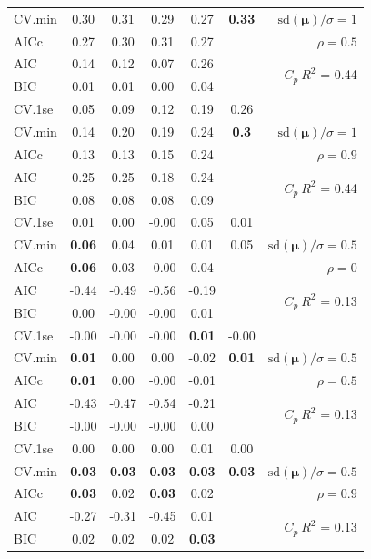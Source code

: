 \documentclass[12pt]{article}
\newcommand{\mr}[1]{\mathrm{#1}}
\newcommand{\bm}[1]{\mathbf{#1}}
\begin{document}
\begin{table}[p]
\begin{center}
\begin{tabular}{l*{5}{c}|r}
CV.min & 0.30 & 0.31 & 0.29 & 0.27 & {\bf 0.33} &  $\mr{sd}(\bm{\mu})/\sigma=1$ \\
AICc & 0.27 & 0.30 & 0.31 & 0.27 & & $\rho=0.5$ \\
AIC & 0.14 & 0.12 & 0.07 & 0.26 & & \multirow{2}{*}{$C_p ~ R^2$ = 0.44} \\
BIC & 0.01 & 0.01 & 0.00 & 0.04 & & \\
 \hline 
CV.1se & 0.05 & 0.09 & 0.12 & 0.19 & 0.26 &\\
CV.min & 0.14 & 0.20 & 0.19 & 0.24 & {\bf 0.3} &  $\mr{sd}(\bm{\mu})/\sigma=1$ \\
AICc & 0.13 & 0.13 & 0.15 & 0.24 & & $\rho=0.9$ \\
AIC & 0.25 & 0.25 & 0.18 & 0.24 & & \multirow{2}{*}{$C_p ~ R^2$ = 0.44} \\
BIC & 0.08 & 0.08 & 0.08 & 0.09 & & \\
 \hline 
CV.1se & 0.01 & 0.00 & -0.00 & 0.05 & 0.01 &\\
CV.min & {\bf 0.06} & 0.04 & 0.01 & 0.01 & 0.05 &  $\mr{sd}(\bm{\mu})/\sigma=0.5$ \\
AICc & {\bf 0.06} & 0.03 & -0.00 & 0.04 & & $\rho=0$ \\
AIC & -0.44 & -0.49 & -0.56 & -0.19 & & \multirow{2}{*}{$C_p ~ R^2$ = 0.13} \\
BIC & 0.00 & -0.00 & -0.00 & 0.01 & & \\
 \hline 
CV.1se & -0.00 & -0.00 & -0.00 & {\bf 0.01} & -0.00 &\\
CV.min & {\bf 0.01} & 0.00 & 0.00 & -0.02 & {\bf 0.01} &  $\mr{sd}(\bm{\mu})/\sigma=0.5$ \\
AICc & {\bf 0.01} & 0.00 & -0.00 & -0.01 & & $\rho=0.5$ \\
AIC & -0.43 & -0.47 & -0.54 & -0.21 & & \multirow{2}{*}{$C_p ~ R^2$ = 0.13} \\
BIC & -0.00 & -0.00 & -0.00 & 0.00 & & \\
 \hline 
CV.1se & 0.00 & 0.00 & 0.00 & 0.01 & 0.00 &\\
CV.min & {\bf 0.03} & {\bf 0.03} & {\bf 0.03} & {\bf 0.03} & {\bf 0.03} &  $\mr{sd}(\bm{\mu})/\sigma=0.5$ \\
AICc & {\bf 0.03} & 0.02 & {\bf 0.03} & 0.02 & & $\rho=0.9$ \\
AIC & -0.27 & -0.31 & -0.45 & 0.01 & & \multirow{2}{*}{$C_p ~ R^2$ = 0.13} \\
BIC & 0.02 & 0.02 & 0.02 & {\bf 0.03} & & \\
 \hline 
\end{tabular}
\end{center}
\vspace{-1cm}
\end{table}
\end{document}
